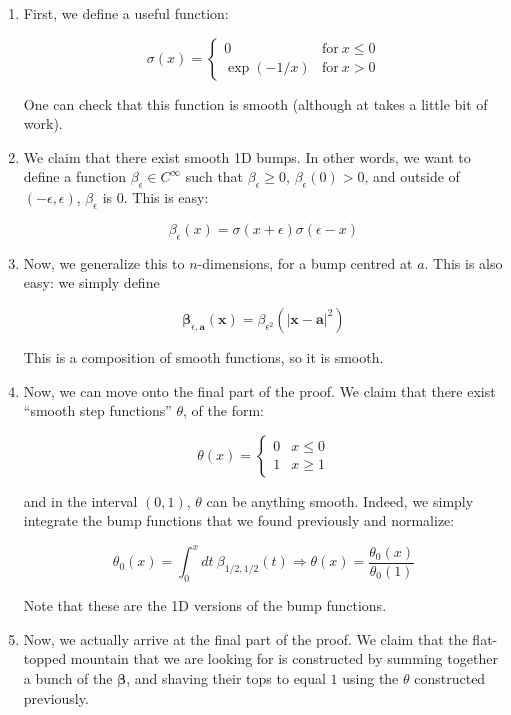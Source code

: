 \documentclass[10pt, oneside]{amsart}
\newcommand{\bm}{\boldsymbol}
\begin{document}
    \begin{enumerate}
    \item First, we define a useful function:

      $$
      \sigma(x) = \begin{cases} 0 & \text{for} \ x \leq 0 \\ \exp(-1/x) & \text{for} \ x > 0 \end{cases}
      $$

      One can check that this function is smooth (although at takes a little bit of work).

    \item We claim that there exist smooth 1D bumps. In other words, we want to define a function
      $\beta_{\epsilon} \in C^{\infty}$ such that $\beta_{\epsilon} \geq 0$, $\beta_{\epsilon}(0) > 0$, and
      outside of $(-\epsilon, \epsilon)$, $\beta_{\epsilon}$ is $0$. This is easy:

      $$\beta_{\epsilon}(x) = \sigma(x + \epsilon) \sigma(\epsilon - x)$$

    \item Now, we generalize this to $n$-dimensions, for a bump centred at $a$. This is also easy: we simply define

      $$\bm{\beta}_{\epsilon, \bm{a}}(\bm{x}) = \beta_{\epsilon^2}(|\bm{x} - \bm{a}|^2)$$

      This is a composition of smooth functions, so it is smooth.
    \item Now, we can move onto the final part of the proof. We claim that there exist ``smooth step functions'' $\theta$, of the form:

      $$\theta(x) = \begin{cases} 0 & x \leq 0 \\ 1 & x \geq 1 \end{cases}$$

      and in the interval $(0, 1)$, $\theta$ can be anything smooth. Indeed, we simply integrate the bump functions that we found previously and normalize:

      $$\theta_0(x) = \displaystyle\int_{0}^{x} dt \ \beta_{1/2, 1/2}(t) \Rightarrow \theta(x) = \frac{\theta_0(x)}{\theta_0(1)}$$

      Note that these are the 1D versions of the bump functions.
    \item Now, we actually arrive at the final part of the proof. We claim that the flat-topped mountain that we are looking for is constructed by summing together a bunch of the $\bm{\beta}$, and shaving their tops to equal $1$ using the $\theta$ constructed previously.
      \newline


\end{enumerate}
\end{document}
